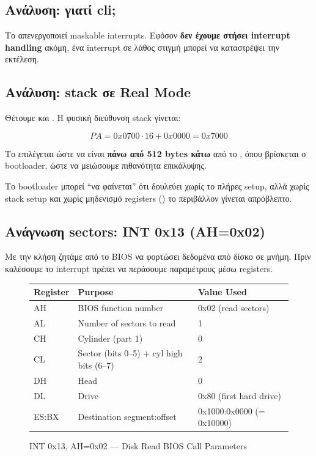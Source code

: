 \documentclass[18pt]{extarticle}
\begin{document}
\subsection{Ανάλυση: γιατί cli;}

Το  απενεργοποιεί maskable interrupts. Εφόσον \textbf{δεν έχουμε στήσει interrupt handling}
ακόμη, ένα interrupt σε λάθος στιγμή μπορεί να καταστρέψει την εκτέλεση.

\subsection{Ανάλυση: stack σε Real Mode}

Θέτουμε  και . Η φυσική διεύθυνση stack γίνεται:

\[
PA = 0x0700 \cdot 16 + 0x0000 = 0x7000
\]

Το  επιλέγεται ώστε να είναι \textbf{πάνω από 512 bytes κάτω} από το , όπου βρίσκεται ο bootloader,
ώστε να μειώσουμε πιθανότητα επικάλυψης.

\begin{info}[Σημείωση]
Το bootloader μπορεί “να φαίνεται” ότι δουλεύει χωρίς το πλήρες setup, αλλά χωρίς stack setup και χωρίς μηδενισμό
registers () το περιβάλλον γίνεται απρόβλεπτο.
\end{info}

\subsection{Ανάγνωση sectors: INT 0x13 (AH=0x02)}

Με την κλήση  ζητάμε από το BIOS να φορτώσει δεδομένα από δίσκο σε μνήμη.
Πριν καλέσουμε το interrupt πρέπει να περάσουμε παραμέτρους μέσω registers.

\begin{figure}[H]
    \centering
    \begin{tabular}{|l|l|l|}
        \hline
        \textbf{Register} & \textbf{Purpose} & \textbf{Value Used} \\
        \hline
        AH & BIOS function number & 0x02 (read sectors) \\
        \hline
        AL & Number of sectors to read & 1 \\
        \hline
        CH & Cylinder (part 1) & 0 \\
        \hline
        CL & Sector (bits 0--5) + cyl high bits (6--7) & 2 \\
        \hline
        DH & Head & 0 \\
        \hline
        DL & Drive & 0x80 (first hard drive) \\
        \hline
        ES:BX & Destination segment:offset & 0x1000:0x0000 (= 0x10000) \\
        \hline
    \end{tabular}
    \caption{INT 0x13, AH=0x02 — Disk Read BIOS Call Parameters}
    \label{fig:int13_params}
\end{figure}
\end{document}

